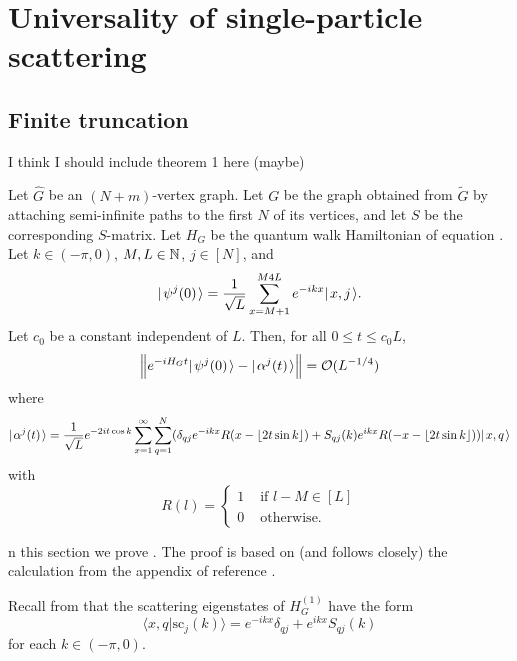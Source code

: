 \documentclass[../thesis-main/thesis-main]{subfiles}
\begin{document}
\chapter{Universality of single-particle scattering}
\label{chap:SP_universality}

\section{Finite truncation}

I think I should include theorem 1 here (maybe)

\begin{theorem} Let $\widehat{G}$ be an $(N+m)$-vertex graph.  Let $G$ be the graph obtained from $\widetilde{G}$ by attaching semi-infinite paths to the first $N$ of its vertices, and let $S$ be the corresponding $S$-matrix.  Let $H_G$ be the quantum walk Hamiltonian of equation . Let $k\in (-\pi,0)$, $M,L\in \mathbb{N}$, $j\in [N]$, and 
\begin{equation}
  |\mspace{2mu} \psi^j(0) \mspace{2mu} \rangle = \frac{1}{\sqrt{L}} \sum_{x=M+1}^{M4L} e^{-i k x} |\mspace{2mu} x,j \mspace{2mu} \rangle.
\end{equation}
Let $c_0$ be a constant independent of $L$.  Then, for all $0 \leq t \leq c_0 L$,
\begin{equation}
   \Big\|e^{-i H_G t}|\mspace{2mu} \psi^j(0) \mspace{2mu} \rangle - |\mspace{2mu} \alpha^j(t) \mspace{2mu} \rangle\Big\| = \mathcal{O}(L^{-1/4})
\end{equation}
where
\begin{equation}
  |\mspace{2mu} \alpha^j(t) \mspace{2mu} \rangle = \frac{1}{\sqrt{L}} e^{-2 i t \cos k} \sum_{x=1}^\infty \sum_{q=1}^N (\delta_{qj} e^{-ikx} R(x- \lfloor 2t \sin k\rfloor ) + S_{qj}(k) e^{ikx} R(-x - \lfloor 2t \sin k\rfloor ) ) |\mspace{2mu} x,q \mspace{2mu} \rangle
\end{equation}
with
\begin{equation}
  R(l) = \begin{cases} 1 & \text{ if } l- M \in [L]\\
    0 & \text{ otherwise.}
    \end{cases}
\end{equation}
\end{theorem}
n this section we prove . The proof is based on (and follows closely) the calculation from the appendix of reference \cite{FGG08}.

Recall from  that the scattering eigenstates of $H_{G}^{(1)}$ have the
form
\[
\langle x,q|\text{sc}_{j}(k)\rangle=e^{-ikx}\delta_{qj}+e^{ikx}S_{qj}(k)\]
 for each $k\in(-\pi,0)$. 
\end{document}
